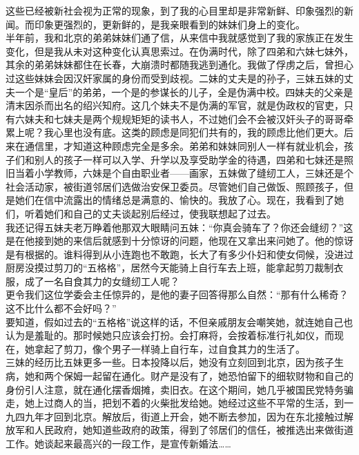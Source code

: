 这些已经被新社会视为正常的现象，到了我的心目里却是非常新鲜、印象强烈的新闻。而印象更强烈的，更新鲜的，是我亲眼看到的妹妹们身上的变化。\\

半年前，我和北京的弟弟妹妹们通了信，从来信中我就感觉到了我的家族正在发生变化，但是我从未对这种变化认真思索过。在伪满时代，除了四弟和六妹七妹外，其余的弟弟妹妹都住在长春，大崩溃时都随我逃到通化。我做了俘虏之后，曾担心过这些妹妹会因汉奸家属的身份而受到歧视。二妹的丈夫是的孙子，三妹五妹的丈夫一个是“皇后”的弟弟，一个是的参谋长的儿子，全是伪满中校。四妹夫的父亲是清末因杀而出名的绍兴知府。这几个妹夫不是伪满的军官，就是伪政权的官吏，只有六妹夫和七妹夫是两个规规矩矩的读书人，不过她们会不会被汉奸头子的哥哥牵累上呢？我心里也没有底。这类的顾虑是同犯们共有的，我的顾虑比他们更大。后来在通信里，才知道这种顾虑完全是多余。弟弟和妹妹同别人一样有就业机会，孩子们和别人的孩子一样可以入学、升学以及享受助学金的待遇，四弟和七妹还是照旧当着小学教师，六妹是个自由职业者——画家，五妹做了缝纫工人，三妹还是个社会活动家，被街道邻居们选做治安保卫委员。尽管她们自己做饭、照顾孩子，但是她们在信中流露出的情绪总是满意的、愉快的。我放了心。现在，我看到了她们，听着她们和自己的丈夫谈起别后经过，使我联想起了过去。\\

我还记得五妹夫老万睁着他那双大眼睛问五妹：“你真会骑车了？你还会缝纫？”这是在他接到她的来信后就感到十分惊讶的问题，他现在又拿出来问她了。他的惊讶是有根据的。谁料得到从小连跑也不敢跑，长大了有多少仆妇和使女伺候，没进过厨房没摸过剪刀的“五格格”，居然今天能骑上自行车去上班，能拿起剪刀裁制衣服，成了一名自食其力的女缝纫工人呢？\\

更令我们这位学委会主任惊异的，是他的妻子回答得那么自然：“那有什么稀奇？这不比什么都不会好吗？”\\

要知道，假如过去的“五格格”说这样的话，不但亲戚朋友会嘲笑她，就连她自己也认为是羞耻的。那时候她只应该会打扮。会打麻将，会按着标准行礼如仪，而现在，她拿起了剪刀，像个男子一样骑上自行车，过自食其力的生活了。\\

三妹的经历比五妹更多一些。日本投降以后，她没有立刻回到北京，因为孩子生病，她和两个保姆一起留在通化。财产是没有了，她恐怕留下的细软财物和自己的身份引人注意，就在通化摆香烟摊，卖旧衣。在这个期间，她几乎被国民党特务骗走，她上过商人的当，把划不着的火柴批发给她。她经过这些不平常的生活，到一九四九年才回到北京。解放后，街道上开会，她不断去参加，因为在东北接触过解放军和人民政府，她知道些政府的政策，得到了邻居们的信任，被推选出来做街道工作。她谈起来最高兴的一段工作，是宣传新婚法……\\

